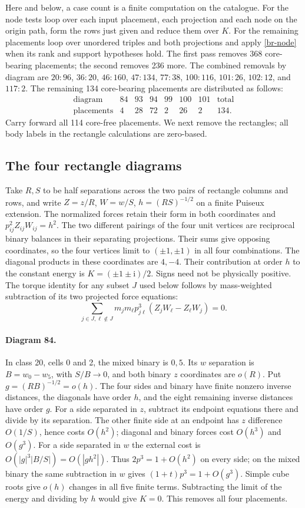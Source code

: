 \documentclass[11pt,letterpaper]{article}
\theoremstyle{definition}
\begin{document}
Here and below, a case count is a finite computation on the catalogue.
For the node tests loop over each input placement, each projection and
each node on the origin path, form the rows just given and reduce them
over $K$. For the remaining placements loop over unordered triples and
both projections and apply \eqref{br-node} when its rank and support
hypotheses hold. The first pass removes 368 core-bearing placements;
the second removes 236 more. The combined removals by diagram are
$20:96$, $36:20$, $46:160$, $47:134$, $77:38$, $100:116$, $101:26$,
$102:12$, and $117:2$. The remaining 134 core-bearing placements are
distributed as follows:
\[
\begin{array}{c|rrrrrrr}
 \text{diagram}&84&93&94&99&100&101&\text{total}\\ \hline
 \text{placements}&4&28&72&2&26&2&134 .
\end{array}
\]
Carry forward all 114 core-free placements. We next remove the
rectangles; all body labels in the rectangle calculations are zero-based.

\subsection{The four rectangle diagrams}
Take $R,S$ to be half separations across the two pairs of rectangle
columns and rows, and write $Z=z/R$, $W=w/S$, $h=(RS)^{-1/2}$ on a
finite Puiseux extension. The normalized forces retain their form in
both coordinates and $p_{ij}^2 Z_{ij}W_{ij}=h^2$. The two different
pairings of the four unit vertices are reciprocal binary balances in
their separating projections. Their sums give opposing coordinates,
so the four vertices limit to $(\pm1,\pm1)$ in all four combinations.
The diagonal products in these coordinates are $4,-4$. Their
contribution at order $h$ to the constant energy is
$K=(\pm1\pm\mathrm i)/2$. Signs need not be physically positive.
The torque identity for any subset $J$ used below follows by
mass-weighted subtraction of its two projected force equations:
\[
 \sum_{j\in J,\ell\notin J}m_jm_\ell p_{j\ell}^3
 (Z_jW_\ell-Z_\ell W_j)=0 .
\]

\paragraph{Diagram 84.}
In class 20, cells 0 and 2, the mixed binary is $0,5$. Its $w$ separation
is $B=w_0-w_5$, with $S/B\to0$, and both binary $z$ coordinates are
$o(R)$. Put $g=(RB)^{-1/2}=o(h)$. The four sides and binary have finite
nonzero inverse distances, the diagonals have order $h$, and the eight
remaining inverse distances have order $g$. For a side separated in
$z$, subtract its endpoint equations there and divide by its separation.
The other finite side at an endpoint has $z$ difference $O(1/S)$,
hence costs $O(h^2)$; diagonal and binary forces cost $O(h^3)$ and
$O(g^3)$. For a side separated in $w$ the external cost is
$O(|g|^3|B/S|)=O(|g h^2|)$. Thus $2p^3=1+O(h^2)$ on every side;
on the mixed binary the same subtraction in $w$ gives
$(1+t)p^3=1+O(g^3)$. Simple cube roots give $o(h)$ changes in all five
finite terms. Subtracting the limit of the energy and dividing by $h$
would give $K=0$. This removes all four placements.
\end{document}
